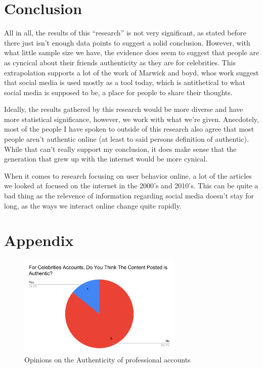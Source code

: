 \documentclass[12pt]{article}
\begin{document}
\begin{doublespace}
\section*{Conclusion}
    \par All in all, the results of this ``research'' is not very significant, as stated before there just isn't enough data points to suggest a solid conclusion.
        However, with what little sample size we have, the evidence does seem to suggest that people are as cyncical about their friends authenticity as they are for celebrities. 
        This extrapolation supports a lot of the work of Marwick and boyd, whos work suggest that social media is used mostly as a tool today, which is antithetical to what social media is supposed to be, a place for people to share their thoughts.
    \par Ideally, the results gathered by this research would be more diverse and have more statistical significance, however, we work with what we're given. 
        Anecdotely, most of the people I have spoken to outside of this research also agree that most people aren't authentic online (at least to said persons definition of authentic).
        While that can't really support my conclusion, it does make sense that the generation that grew up with the internet would be more cynical.
    \par When it comes to research focusing on user behavior online, a lot of the articles we looked at focused on the internet in the 2000's and 2010's. This can be quite a bad thing as the relevence of information regarding social media doesn't stay for long, as the ways we interact online change quite rapidly. 




    \newpage \printbibliography
    \newpage
    \section*{Appendix}
    \label{sec:appendix}
    \begin{figure}[h]
        \includegraphics[width=0.7\textwidth]{For Celebrities Accounts, Do You Think The Content Posted is Authentic_.pdf}
        \centering
        \caption{Opinions on the Authenticity of professional accounts}
        \label{fig:chart2}
    \end{figure}


\end{doublespace}
\end{document}
